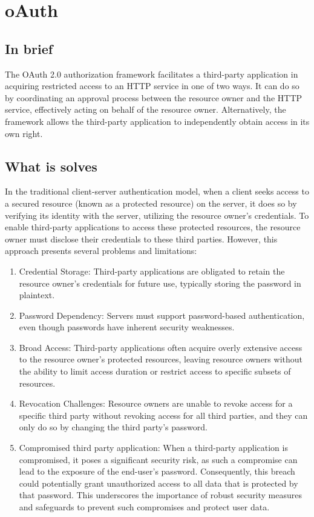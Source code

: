 \section*{oAuth}

\subsection*{In brief}
The OAuth 2.0 authorization framework facilitates a third-party application in acquiring restricted access to an HTTP service in one of two ways. It can do so by coordinating an approval process between the resource owner and the HTTP service, effectively acting on behalf of the resource owner. Alternatively, the framework allows the third-party application to independently obtain access in its own right.
\subsection*{What is solves}
In the traditional client-server authentication model, when a client seeks access to a secured resource (known as a protected resource) on the server, it does so by verifying its identity with the server, utilizing the resource owner's credentials. To enable third-party applications to access these protected resources, the resource owner must disclose their credentials to these third parties. However, this approach presents several problems and limitations:
\begin{enumerate}

\item Credential Storage: Third-party applications are obligated to retain the resource owner's credentials for future use, typically storing the password in plaintext.

\item Password Dependency: Servers must support password-based authentication, even though passwords have inherent security weaknesses.

\item Broad Access: Third-party applications often acquire overly extensive access to the resource owner's protected resources, leaving resource owners without the ability to limit access duration or restrict access to specific subsets of resources.

\item Revocation Challenges: Resource owners are unable to revoke access for a specific third party without revoking access for all third parties, and they can only do so by changing the third party's password.

\item Compromised third party application: When a third-party application is compromised, it poses a significant security risk, as such a compromise can lead to the exposure of the end-user's password. Consequently, this breach could potentially grant unauthorized access to all data that is protected by that password. This underscores the importance of robust security measures and safeguards to prevent such compromises and protect user data.

\end{enumerate}
